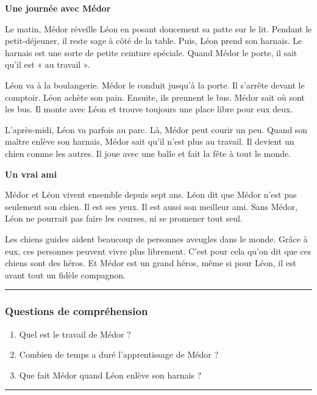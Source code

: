 \documentclass[
  french,
  14pt,
  a4paper,
]{extarticle}
\providecommand{\tightlist}{%
  \setlength{\itemsep}{0pt}\setlength{\parskip}{0pt}}
\begin{document}
\textbf{Une journée avec Médor}

Le matin, Médor réveille Léon en posant doucement sa patte sur le lit.
Pendant le petit-déjeuner, il reste sage à côté de la table. Puis, Léon
prend son harnais. Le harnais est une sorte de petite ceinture spéciale.
Quand Médor le porte, il sait qu'il est « au travail ».

Léon va à la boulangerie. Médor le conduit jusqu'à la porte. Il s'arrête
devant le comptoir. Léon achète son pain. Ensuite, ils prennent le bus.
Médor sait où sont les bus. Il monte avec Léon et trouve toujours une
place libre pour eux deux.

L'après-midi, Léon va parfois au parc. Là, Médor peut courir un peu.
Quand son maître enlève son harnais, Médor sait qu'il n'est plus au
travail. Il devient un chien comme les autres. Il joue avec une balle et
fait la fête à tout le monde.

\textbf{Un vrai ami}

Médor et Léon vivent ensemble depuis sept ans. Léon dit que Médor n'est
pas seulement son chien. Il est ses yeux. Il est aussi son meilleur ami.
Sans Médor, Léon ne pourrait pas faire les courses, ni se promener tout
seul.

Les chiens guides aident beaucoup de personnes aveugles dans le monde.
Grâce à eux, ces personnes peuvent vivre plus librement. C'est pour cela
qu'on dit que ces chiens sont des héros. Et Médor est un grand héros,
même si pour Léon, il est avant tout un fidèle compagnon.

\begin{center}\rule{0.5\linewidth}{0.5pt}\end{center}

\subsubsection{Questions de
compréhension}\label{questions-de-compruxe9hension-13}

\begin{enumerate}
\def\labelenumi{\arabic{enumi}.}
\tightlist
\item
  Quel est le travail de Médor ?
\item
  Combien de temps a duré l'apprentissage de Médor ?
\item
  Que fait Médor quand Léon enlève son harnais ?
\end{enumerate}

\begin{center}\rule{0.5\linewidth}{0.5pt}\end{center}
\end{document}
